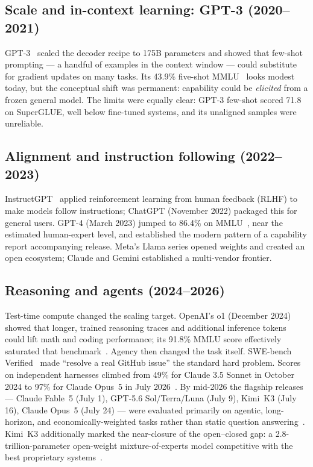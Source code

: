 \subsection{Scale and in-context learning: GPT-3 (2020--2021)}
GPT-3~\cite{brown2020gpt3} scaled the decoder recipe to 175B parameters and
showed that few-shot prompting --- a handful of examples in the context window
--- could substitute for gradient updates on many tasks. Its 43.9\%
five-shot MMLU~\cite{hendrycks2021mmlu} looks modest today, but the conceptual
shift was permanent: capability could be \emph{elicited} from a frozen general
model. The limits were equally clear: GPT-3 few-shot scored 71.8 on SuperGLUE,
well below fine-tuned systems, and its unaligned samples were unreliable.

\subsection{Alignment and instruction following (2022--2023)}
InstructGPT~\cite{ouyang2022instructgpt} applied reinforcement learning from
human feedback (RLHF) to make models follow instructions; ChatGPT (November
2022) packaged this for general users. GPT-4 (March 2023) jumped to 86.4\% on
MMLU~\cite{openai2023gpt4}, near the estimated human-expert level, and
established the modern pattern of a capability report accompanying release.
Meta's Llama series opened weights and created an open ecosystem; Claude and
Gemini established a multi-vendor frontier.

\subsection{Reasoning and agents (2024--2026)}
Test-time compute changed the scaling target. OpenAI's o1 (December 2024)
showed that longer, trained reasoning traces and additional inference tokens
could lift math and coding performance; its 91.8\% MMLU score effectively
saturated that benchmark~\cite{benchlm_mmlu}. Agency then changed the task
itself. SWE-bench Verified~\cite{jimenez2024swebench,openai2024swebenchverified}
made ``resolve a real GitHub issue'' the standard hard problem. Scores on
independent harnesses climbed from 49\% for Claude 3.5 Sonnet in October 2024
to 97\% for Claude Opus~5 in July 2026~\cite{vals2026swebench}. By mid-2026
the flagship
releases --- Claude Fable~5 (July 1), GPT-5.6 Sol/Terra/Luna (July 9), Kimi~K3
(July 16), Claude Opus~5 (July 24) --- were evaluated primarily on agentic,
long-horizon, and economically-weighted tasks rather than static question
answering~\cite{anthropic2026fable5,openai2026gpt56,moonshot2026k3,anthropic2026opus5}.
Kimi~K3 additionally marked the near-closure of the open--closed gap: a
2.8-trillion-parameter open-weight mixture-of-experts model competitive with
the best proprietary systems~\cite{moonshot2026k3}.

